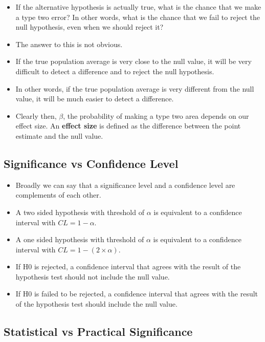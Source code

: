 \documentclass[]{book}
\providecommand{\tightlist}{%
  \setlength{\itemsep}{0pt}\setlength{\parskip}{0pt}}
\begin{document}
\begin{itemize}
\tightlist
\item
  If the alternative hypothesis is actually true, what is the chance that we make a type two error? In other words, what is the chance that we fail to reject the null hypothesis, even when we should reject it?
\item
  The answer to this is not obvious.
\item
  If the true population average is very close to the null value, it will be very difficult to detect a difference and to reject the null hypothesis.
\item
  In other words, if the true population average is very different from the null value, it will be much easier to detect a difference.
\item
  Clearly then, \(\beta\), the probability of making a type two area depends on our effect size. An \textbf{effect size} is defined as the difference between the point estimate and the null value.
\end{itemize}

\hypertarget{significance-vs-confidence-level}{%
\subsection*{Significance vs Confidence Level}\label{significance-vs-confidence-level}}

\begin{itemize}
\tightlist
\item
  Broadly we can say that a significance level and a confidence level are complements of each other.
\item
  A two sided hypothesis with threshold of \(\alpha\) is equivalent to a confidence interval with \(CL = 1 - \alpha\).
\item
  A one sided hypothesis with threshold of \(\alpha\) is equivalent to a confidence interval with \(CL = 1 - (2 \times \alpha)\).
\item
  If H0 is rejected, a confidence interval that agrees with the result of the hypothesis test should not include the null value.
\item
  If H0 is failed to be rejected, a confidence interval that agrees with the result of the hypothesis test should include the null value.
\end{itemize}

\hypertarget{statistical-vs-practical-significance}{%
\subsection*{Statistical vs Practical Significance}\label{statistical-vs-practical-significance}}
\end{document}
